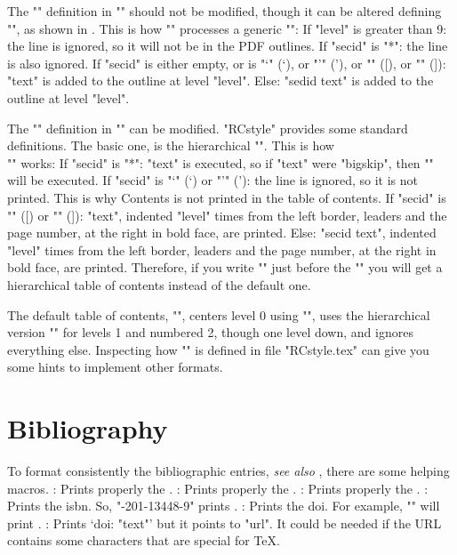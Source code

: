 The "\tocline" definition in "\files"
should not be modified, though it can be altered
defining "\doextrapdf", as shown in .
This is how "\files" processes a generic
"":
\beginpoints
\point If "level" is greater than 9: the line is ignored, so it will not be
 in the PDF outlines.
\point If "secid" is "*": the line is also ignored.
\point If "secid" is either empty,
 or is "\lq" (`), or  "\rq" ('), or "\lbrack" ([), or "\lbrack" (]):
 "text" is added to the outline at level "level".
\point Else: "sedid text" is added to the outline at level "level".
\endpoints

The "\tocline" definition in "\maketoc" can be modified.
"RCstyle" provides some standard definitions.
The basic one, is the hierarchical "\toclineX". This is how\\
"" works:
\beginpoints
\point If "secid" is "*": "\csname text\endcsname" is executed,
 so if "text" were "bigskip", then "\bigskip" will be executed.
\point If "secid" is "\lq" (`) or "\rq" ('): the line is ignored,
 so it is not printed.
 This is why Contents is not printed in the table of contents.
\point If "secid" is "\lbrack" ([) or "\rbrack" (]):
 "text", indented "level" times from the left border,
 leaders and the page number, at the right in bold face, are printed.
\point Else: "secid text", indented "level" times from the left border,
 leaders and the page number, at the right in bold face, are printed.
\endpoints
Therefore, if you write "\let\tocline=\toclineX" just before the
"\maketoc" you will get a hierarchical table of contents
instead of the default one.

The default table of contents, "\toclineR",
centers level 0 using "\toclineC",
uses the hierarchical version "\toclineX" for levels 1 and numbered 2,
though one level down,
and ignores everything else.
Inspecting how "\toclineR" is defined in file "RCstyle.tex"
can give you some hints to implement other formats.


\section{Bibliography}

To format consistently the bibliographic entries,
{\em see also} ,
there are some helping macros.
\command{}: Prints properly the .
\command{}: Prints properly the .
\command{}: Prints properly the .
\command\ISBN: Prints the {\sc isbn}. So,
 "-201-13448-9" prints .
\command{}: Prints the {\sc doi}. For example,
 "" will print
  .
\command{}: Prints ‘{\sc doi}: "text"’
 but it points to "url". It could be needed if the
 URL contains some characters that are special for {\TeX}.


